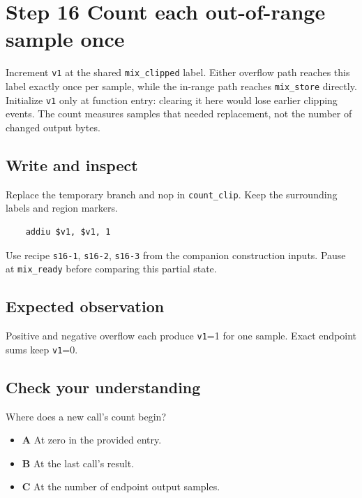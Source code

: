 \section{Step 16 Count each out-of-range sample once}\label{pcm-s16}

Increment \texttt{v1} at the shared \texttt{mix\_clipped} label. Either overflow path reaches this label exactly once per sample, while the in-range path reaches \texttt{mix\_store} directly. Initialize \texttt{v1} only at function entry: clearing it here would lose earlier clipping events. The count measures samples that needed replacement, not the number of changed output bytes.

\subsection{Write and inspect}
Replace the temporary branch and nop in \texttt{count\_clip}. Keep the surrounding labels and region markers.

\begin{verbatim}
    addiu $v1, $v1, 1
\end{verbatim}
Use recipe \texttt{s16-1}, \texttt{s16-2}, \texttt{s16-3} from the companion construction inputs. Pause at \texttt{mix\_ready} before comparing this partial state.

\subsection{Expected observation}
Positive and negative overflow each produce \texttt{v1}=1 for one sample. Exact endpoint sums keep \texttt{v1}=0.

\subsection{Check your understanding}
Where does a new call’s count begin?

\begin{itemize}
  \item \textbf{A} At zero in the provided entry.
  \item \textbf{B} At the last call’s result.
  \item \textbf{C} At the number of endpoint output samples.
\end{itemize}
